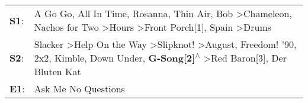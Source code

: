 \begin{supertabular}{p{0.03\textwidth}p{0.92\textwidth}}
 \textbf{S1}:  &                                  A Go Go\textsuperscript{}, \enspace All In Time\textsuperscript{}, \enspace Rosanna\textsuperscript{}, \enspace Thin Air\textsuperscript{}, \enspace Bob\textsuperscript{} \textgreater \enspace Chameleon\textsuperscript{}, \enspace Nachos for Two\textsuperscript{} \textgreater \enspace Hours\textsuperscript{} \textgreater \enspace Front Porch[1]\textsuperscript{}, \enspace Spain\textsuperscript{} \textgreater \enspace Drums\textsuperscript{}  \enspace  \\
 \textbf{S2}:  &  Slacker\textsuperscript{} \textgreater \enspace Help On the Way\textsuperscript{} \textgreater \enspace Slipknot!\textsuperscript{} \textgreater \enspace August\textsuperscript{}, \enspace Freedom! '90\textsuperscript{}, \enspace 2x2\textsuperscript{}, \enspace Kimble\textsuperscript{}, \enspace Down Under\textsuperscript{}, \enspace \textbf{G-Song[2]\textsuperscript{$\wedge$}} \textgreater \enspace Red Baron[3]\textsuperscript{}, \enspace Der Bluten Kat\textsuperscript{}  \enspace  \\
 \textbf{E1}:  &                                                                                                                                                                                                                                                                                                                                                                                                                                                         Ask Me No Questions\textsuperscript{}  \enspace  \\
\end{supertabular}

